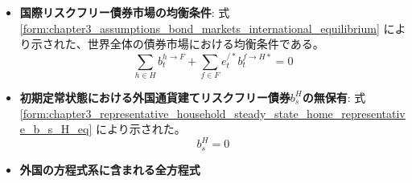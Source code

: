 \begin{itemize}
        式
        \eqref{form:chapter3_representative_household_goods_market_home_representative_y_H_eq}
        により示された。
        \begin{equation}
        \label{form:chapter5_two_plane_classification_external_y_H_eq}
            y_t^H=c_t^{H\to H}+\frac{M}{N}c_t^{F\to H}
        \end{equation}
    \item
    \label{itm:chapter5_two_plane_classification_external_international_bond_equilibrium}
        \textbf{国際リスクフリー債券市場の均衡条件}:
        式
        \eqref{form:chapter3_assumptions_bond_markets_international_equilibrium}
        により示された、世界全体の債券市場における均衡条件である。
        \begin{equation}
        \label{form:chapter5_two_plane_classification_external_international_bond_equilibrium_eq}
            \sum_{h\in H}b_t^{h\to F}+\sum_{f\in F}e_t^{/*}b_t^{f\to H*}=0
        \end{equation}
    \item
    \label{itm:chapter5_two_plane_classification_external_steady_state}
        \textbf{初期定常状態における外国通貨建てリスクフリー債券\(b_s^H\)の無保有}:
        式
        \eqref{form:chapter3_representative_household_steady_state_home_representative_b_s_H_eq}
        により示された。
        \begin{equation}
        \label{form:chapter5_two_plane_classification_external_b_s_H_eq}
            b_s^H=0
        \end{equation}
    \item
    \label{itm:chapter5_two_plane_classification_external_foreign_system}
        \textbf{外国の方程式系に含まれる全方程式}
\end{itemize}
